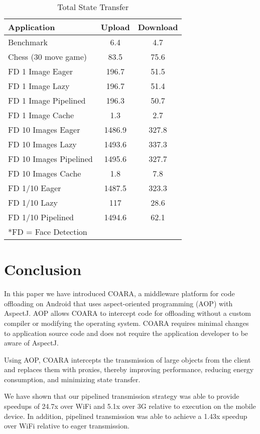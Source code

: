 \documentclass[10pt,journal,cspaper,compsoc]{IEEEtran}
\begin{document}
{\begin{table}
\centering
\caption{Total State Transfer\label{table:transmission}}
\begin{tabular}{|l|c|c|} \hline
\textbf{Application}&\textbf{Upload}&\textbf{Download}\\ \hline
Benchmark &6.4  &4.7\\ \hline
Chess (30 move game)  &83.5 &75.6\\ \hline
FD 1 Image Eager  &196.7  &51.5\\ \hline
FD 1 Image Lazy &196.7  &51.4\\ \hline
FD 1 Image Pipelined  &196.3  &50.7\\ \hline
FD 1 Image Cache  &1.3  &2.7\\ \hline
FD 10 Images Eager  &1486.9 &327.8\\ \hline
FD 10 Images Lazy &1493.6 &337.3\\ \hline
FD 10 Images Pipelined  &1495.6 &327.7\\ \hline
FD 10 Images Cache  &1.8  &7.8\\ \hline
FD 1/10 Eager &1487.5 &323.3\\ \hline
FD 1/10 Lazy  &117  &28.6\\ \hline
FD 1/10 Pipelined &1494.6 &62.1\\ \hline
\multicolumn{3}{|l|}{*FD = Face Detection} \\
\hline\end{tabular}
\end{table}


\section{Conclusion}
\label{sec:conclusion}


In this paper we have introduced COARA, a middleware platform for code offloading on Android that uses aspect-oriented programming (AOP) with AspectJ.  AOP allows COARA to intercept code for offloading without a custom compiler or modifying the operating system. COARA requires minimal changes to application source code and does not require the application developer to be aware of AspectJ.

Using AOP, COARA intercepts the transmission of large objects from the client and replaces them with proxies, thereby improving performance, reducing energy consumption, and minimizing state transfer.

We have shown that our pipelined transmission strategy was able to provide speedups of 24.7x over WiFi and 5.1x over 3G relative to execution on the mobile device.  In addition, pipelined transmission was able to achieve a 1.43x speedup over WiFi relative to eager transmission.

}
\end{document}
